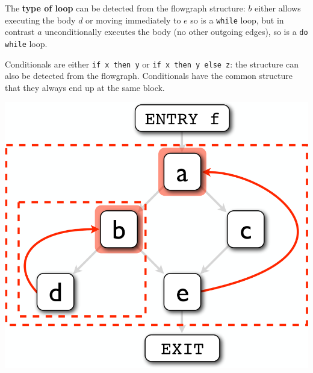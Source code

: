 \documentclass[a4paper, 11pt]{article}
\begin{document}
{\begin{minipage}[t]{0.47\textwidth}
    The \textbf{type of loop} can be detected from the flowgraph structure: \(b\) either allows executing the body \(d\) or moving immediately to \(e\) so is a \texttt{while} loop, but in contrast \(a\) unconditionally executes the body (no other outgoing edges), so is a \texttt{do while} loop.

    \vspace{3mm}

    Conditionals are either \texttt{if x then y} or \texttt{if x then y else z}: the structure can also be detected from the flowgraph. Conditionals have the common structure that they always end up at the same block.
    \end{minipage}
    \hspace{5mm}
    \begin{minipage}[t]{0.47\textwidth}
    \vspace{0pt}
    \includegraphics[width=\textwidth]{loops.png}


\end{minipage}}
\end{document}
